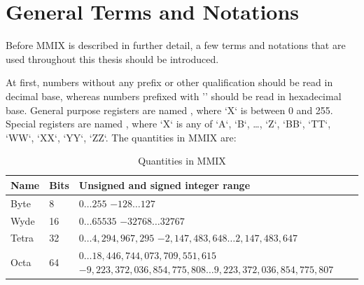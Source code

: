 \section{General Terms and Notations}

Before MMIX is described in further detail, a few terms and notations that are used throughout this thesis should be introduced.

At first, numbers without any prefix or other qualification should be read in decimal base, whereas numbers prefixed with '\haddr{}' should be read in hexadecimal base. General purpose registers are named , where `X` is between 0 and 255. Special registers are named , where `X` is any of `A`, `B`, \dots, `Z`, `BB`, `TT`, `WW`, `XX`, `YY`, `ZZ`. The quantities in MMIX are:
\begin{table}[H]
	\begin{tabular}{| p{13mm} | p{13mm} | p{106mm} |}
		\hline \textbf{Name} & \textbf{Bits} & \textbf{Unsigned and signed integer range} \\
		\hline Byte & 8 &
		$0 \dots 255$ \newline
		$-128 \dots 127$
		\\
		\hline Wyde & 16 &
		$0 \dots 65535$ \newline
		$-32768 \dots 32767$
		\\
		\hline Tetra & 32 &
		$0 \dots 4,294,967,295$ \newline
		$-2,147,483,648 \dots 2,147,483,647$
		\\
		\hline Octa & 64 &
		$0 \dots 18,446,744,073,709,551,615$ \newline
		$-9,223,372,036,854,775,808 \dots 9,223,372,036,854,775,807$
		\\
		\hline
	\end{tabular}
	\caption{Quantities in MMIX \citep[pg. 3]{mmix-doc}}
\end{table}

